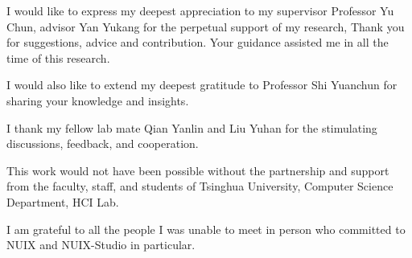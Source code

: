 \begin{acknowledgements}

  I would like to express my deepest appreciation to my supervisor Professor Yu Chun, advisor Yan Yukang for the perpetual support of my research, Thank you for suggestions, advice and contribution. Your guidance assisted me in all the time of this research.
  
  I would also like to extend my deepest gratitude to Professor Shi Yuanchun for sharing your knowledge and insights. 
  
  I thank my fellow lab mate Qian Yanlin and Liu Yuhan for the stimulating discussions, feedback, and cooperation.
  
  This work would not have been possible without the partnership and support from the faculty, staff, and students of Tsinghua University, Computer Science Department, HCI Lab. 
  
  I am grateful to all the people I was unable to meet in person who committed to NUIX and NUIX-Studio in particular.
  
\end{acknowledgements}
